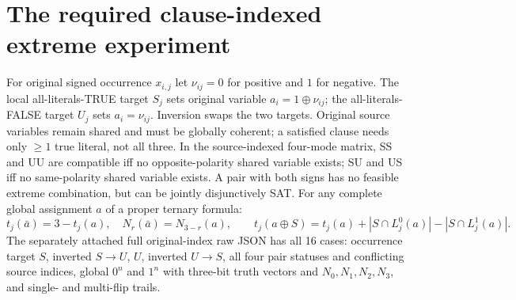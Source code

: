 \documentclass[10pt]{article}
\begin{document}
\section{The required clause-indexed extreme experiment}
For original signed occurrence $x_{i,j}$ let $\nu_{ij}=0$ for positive and $1$ for negative. The local all-literals-TRUE target $S_j$ sets original variable $a_i=1\oplus\nu_{ij}$; the all-literals-FALSE target $U_j$ sets $a_i=\nu_{ij}$. Inversion swaps the two targets. Original source variables remain shared and must be globally coherent; a satisfied clause needs only $\ge1$ true literal, not all three. In the source-indexed four-mode matrix, SS and UU are compatible iff no opposite-polarity shared variable exists; SU and US iff no same-polarity shared variable exists. A pair with both signs has no feasible extreme combination, but can be jointly disjunctively SAT. For any complete global assignment $a$ of a proper ternary formula:
\[
t_j(\bar a)=3-t_j(a),\quad N_r(\bar a)=N_{3-r}(a),\qquad
t_j(a\oplus S)=t_j(a)+|S\cap L_j^0(a)|-|S\cap L_j^1(a)|.
\]
The separately attached full original-index raw JSON has all 16 cases: occurrence target $S$, inverted $S\to U$, $U$, inverted $U\to S$, all four pair statuses and conflicting source indices, global $0^n$ and $1^n$ with three-bit truth vectors and $N_0,N_1,N_2,N_3$, and single- and multi-flip trails.
\end{document}
